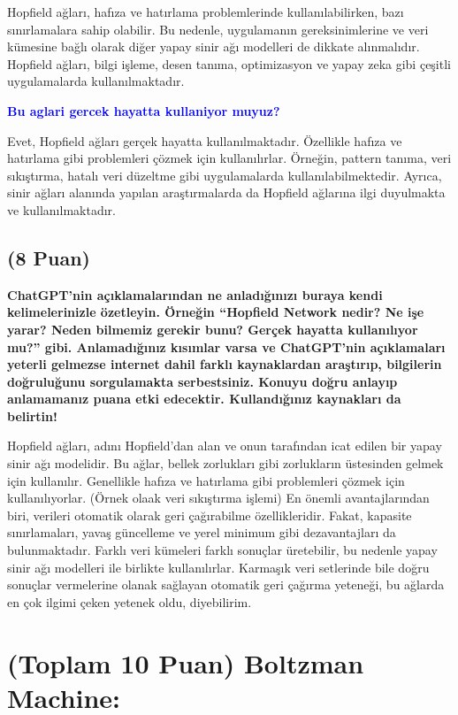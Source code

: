 \documentclass[11pt]{article}
\begin{document}
Hopfield ağları, hafıza ve hatırlama problemlerinde kullanılabilirken, bazı sınırlamalara sahip olabilir. Bu nedenle, uygulamanın gereksinimlerine ve veri kümesine bağlı olarak diğer yapay sinir ağı modelleri de dikkate alınmalıdır. Hopfield ağları, bilgi işleme, desen tanıma, optimizasyon ve yapay zeka gibi çeşitli uygulamalarda kullanılmaktadır.

\textbf{\textcolor{blue}{Bu aglari gercek hayatta kullaniyor muyuz?}}

Evet, Hopfield ağları gerçek hayatta kullanılmaktadır. Özellikle hafıza ve hatırlama gibi problemleri çözmek için kullanılırlar. Örneğin, pattern tanıma, veri sıkıştırma, hatalı veri düzeltme gibi uygulamalarda kullanılabilmektedir. Ayrıca, sinir ağları alanında yapılan araştırmalarda da Hopfield ağlarına ilgi duyulmakta ve kullanılmaktadır.

\subsection{(8 Puan)} \textbf{ChatGPT’nin açıklamalarından ne anladığınızı buraya kendi kelimelerinizle özetleyin. Örneğin ``Hopfield Network nedir? Ne işe yarar? Neden bilmemiz gerekir bunu? Gerçek hayatta kullanılıyor mu?'' gibi. Anlamadığınız kısımlar varsa ve ChatGPT’nin açıklamaları yeterli gelmezse internet dahil farklı kaynaklardan araştırıp, bilgilerin doğruluğunu sorgulamakta serbestsiniz. Konuyu doğru anlayıp anlamamanız puana etki edecektir. Kullandığınız kaynakları da belirtin!}

Hopfield ağları, adını Hopfield'dan alan ve onun tarafından icat edilen bir yapay sinir ağı modelidir. Bu ağlar, bellek zorlukları gibi zorlukların üstesinden gelmek için kullanılır. Genellikle hafıza ve hatırlama gibi problemleri çözmek için kullanılıyorlar. (Örnek olaak veri sıkıştırma işlemi) En önemli avantajlarından biri, verileri otomatik olarak geri çağırabilme özellikleridir. Fakat, kapasite sınırlamaları, yavaş güncelleme ve yerel minimum gibi dezavantajları da bulunmaktadır. Farklı veri kümeleri farklı sonuçlar üretebilir, bu nedenle yapay sinir ağı modelleri ile birlikte kullanılırlar. Karmaşık veri setlerinde bile doğru sonuçlar vermelerine olanak sağlayan otomatik geri çağırma yeteneği, bu ağlarda en çok ilgimi çeken yetenek oldu, diyebilirim.

\section{(Toplam 10 Puan) Boltzman Machine:}
\end{document}
